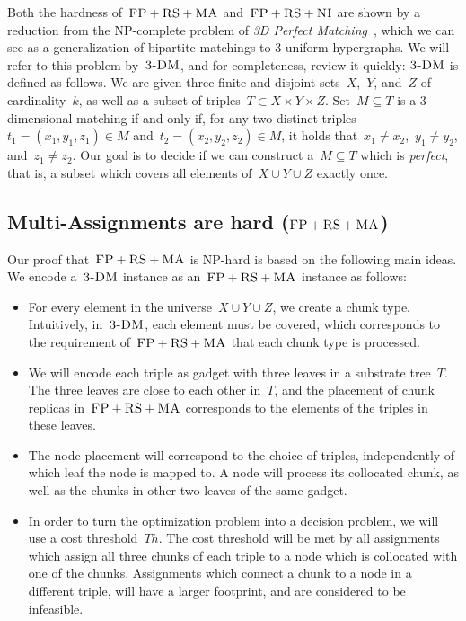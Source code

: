 \documentclass[preprint,12pt]{elsarticle}
\newcommand{\CC}{\textsc{NI}}
\newcommand{\FP}{\textsc{FP}}
\newcommand{\RS}{\textsc{RS}}
\newcommand{\MA}{\textsc{MA}}
\newcommand{\Tree}{\ensuremath{T}}
\newcommand{\TDM}{\textsc{3-DM}}
\newcommand{\Thr}{\ensuremath{Th}}
\begin{document}
Both the hardness of~$\FP+\RS+\MA$ and~$\FP+\RS+\CC$ are shown by a reduction
from the NP-complete problem of \emph{3D Perfect Matching}~\cite{3dmatch},
which we can see as a generalization of bipartite matchings to 3-uniform
hypergraphs. We will refer to this problem by~$\TDM$, and for completeness,
review it quickly:
$\TDM$ is defined as follows. We are given three finite and disjoint
sets~$X$,~$Y$, and~$Z$ of cardinality~$k$, as well as a subset of triples~$T\subset
X \times Y \times Z$.  Set~$M \subseteq T$ is a 3-dimensional matching
if and only if, for any two distinct triples~$t_1=(x_1, y_1, z_1) \in M$
and~$t_2=(x_2, y_2, z_2) \in M$, it holds that~$x_1\neq x_2$,~$y_1\neq
y_2$, and~$z_1\neq z_2$. Our goal is to decide if we can construct
a~$M \subseteq T$ which is \emph{perfect}, that is, a subset which covers all
elements of~$X \cup Y \cup Z$ exactly once.


\subsection{Multi-Assignments are hard ($\FP+\RS+\MA$)}\label{ssec:fprsma}

Our proof that~$\FP+\RS+\MA$ is NP-hard is based on the following main ideas.
We encode a~$\TDM$ instance as an~$\FP+\RS+\MA$ instance as follows:

 \begin{itemize}
 \item For every element in the universe~$X\cup Y\cup
 Z$, we create a chunk type. Intuitively, in~$\TDM$,
 each element must be covered, which corresponds to the requirement
 of~$\FP+\RS+\MA$
 that each chunk type is processed.

 \item We will encode each triple as gadget with three leaves in
 a substrate tree~$\Tree$. The three leaves are close to each
 other in~$\Tree$, and the placement of chunk replicas in~$\FP+\RS+\MA$
 corresponds to the elements of the
 triples in these leaves.

 \item The node placement will correspond to the choice of triples,
 independently of which
leaf the node is mapped to.
 A node will process its collocated chunk,
 as well as the chunks in other two leaves of the same gadget.

\item In order to turn the optimization problem into a decision problem, we will use
a cost threshold~$\Thr$. The cost threshold will be met by all
assignments which assign all three chunks of each triple to a
node which is collocated with one of the chunks. Assignments which connect a
chunk to a node in a different triple, will have a larger footprint, and are
considered to be infeasible.

\end{itemize}
\end{document}
